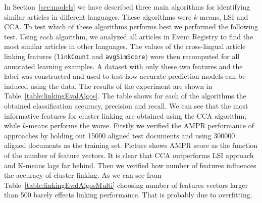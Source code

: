 \documentclass[twoside,11pt]{article}
\newcommand{\oldText}[1]{\textcolor{red}{#1:}\color{blue}}
\begin{document}
In Section~\ref{sec:models} we have described three main algorithms for identifying similar articles in different languages. These algorithms were $k$-means, LSI and CCA. To test which of these algorithms performs best we performed the following test. Using each algorithm, we analyzed all articles in Event Registry to find the most similar articles in other languages. The values of the cross-lingual article linking features (\texttt{linkCount} and \texttt{avgSimScore}) were then recomputed for all annotated learning examples. A dataset with only these two features and the label was constructed and used to test how accurate prediction models can be induced using the data. The results of the experiment are shown in Table~\ref{table:linkingEvalAlgos}. The table shows for each of the algorithms the obtained classification accuracy, precision and recall. We can see that the most informative features for cluster linking are obtained using the CCA algorithm, while $k$-means performs the worse. Firstly we verified the AMPR performance of approaches by holding out 15000 aligned test documents and using 300000 aligned documents
 as the training set. Picture \cite{pc:AMPR} shows AMPR score as the function of the number of feature vectors. It is clear that CCA outperforms LSI approach and K-means lags far behind.
Then we verified how number of features influences the accuracy of cluster linking. As we can see from Table~\ref{table:linkingEvalAlgosMulti} choosing number of features vectors larger than 500 barely effects linking performance. That is probably due to overfitting.

\end{document}
